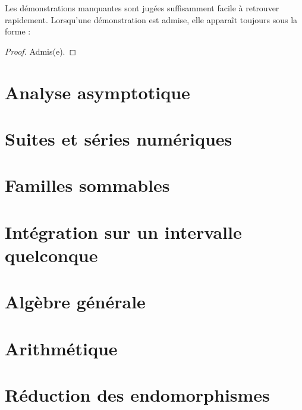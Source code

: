 \documentclass{report}
\begin{document}
Les démonstrations manquantes sont jugées suffisamment facile à retrouver rapidement. Lorsqu'une démonstration est admise, elle apparaît toujours sous la forme :

\begin{proof}
    Admis(e).
\end{proof}

\newpage

\pagestyle{main}

\chapter{Analyse asymptotique}



\chapter{Suites et séries numériques}



\chapter{Familles sommables}



\chapter{Intégration sur un intervalle quelconque}




\chapter{Algèbre générale}



\chapter{Arithmétique}



\chapter{Réduction des endomorphismes}
\end{document}
